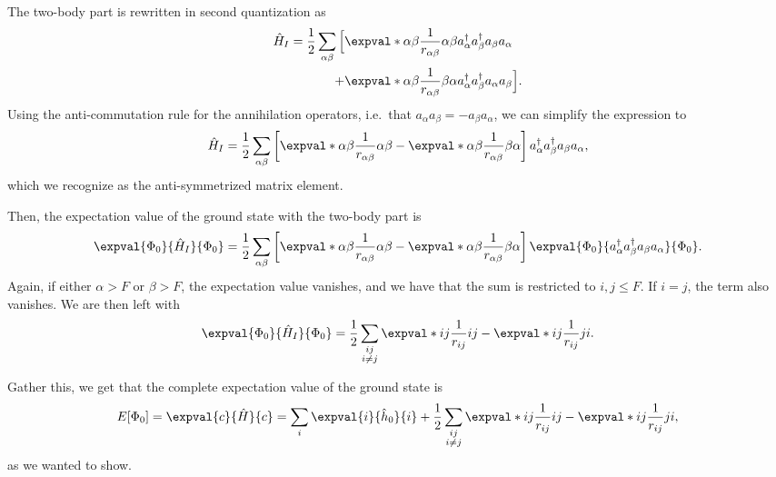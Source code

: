 The two-body part is rewritten in second quantization as
\begin{align*}
    \hat{H}_I = \frac{1}{2} \sum_{\alpha\beta} \Big[ &\expval*{\alpha\beta}{\frac{1}{r_{\alpha\beta}}}{\alpha\beta} a_\alpha^\dagger a_\beta^\dagger a_\beta a_\alpha \\
    + &\expval*{\alpha\beta}{\frac{1}{r_{\alpha\beta}}}{\beta\alpha} a_\alpha^\dagger a_\beta^\dagger a_\alpha a_\beta \Big].
\end{align*}
Using the anti-commutation rule for the annihilation operators, i.e.\ that ${a_\alpha a_\beta = -a_\beta a_\alpha}$, we can simplify the expression to
\begin{equation*}
    \hat{H}_I = \frac{1}{2} \sum_{\alpha\beta} \left[\expval*{\alpha\beta}{\frac{1}{r_{\alpha\beta}}}{\alpha\beta} - \expval*{\alpha\beta}{\frac{1}{r_{\alpha\beta}}}{\beta\alpha}\right] a_\alpha^\dagger a_\beta^\dagger a_\beta a_\alpha,
\end{equation*}
which we recognize as the anti-symmetrized matrix element.

Then, the expectation value of the ground state with the two-body part is
\begin{equation*}
    \expval{\Phi_0}{\hat{H}_I}{\Phi_0} = \frac{1}{2} \sum_{\alpha\beta} \left[\expval*{\alpha\beta}{\frac{1}{r_{\alpha\beta}}}{\alpha\beta} - \expval*{\alpha\beta}{\frac{1}{r_{\alpha\beta}}}{\beta\alpha}\right] \expval{\Phi_0}{a_\alpha^\dagger a_\beta^\dagger a_\beta a_\alpha}{\Phi_0}.
\end{equation*}
Again, if either $\alpha > F$ or $\beta > F$, the expectation value vanishes, and we have that the sum is restricted to $i,j \le F$. If $i = j$, the term also vanishes.
We are then left with
\begin{equation*}
    \expval{\Phi_0}{\hat{H}_I}{\Phi_0}
    = \frac{1}{2} \sum_{\substack{ij\\i \neq j}} \expval*{ij}{\frac{1}{r_{ij}}}{ij} - \expval*{ij}{\frac{1}{r_{ij}}}{ji}.
\end{equation*}

Gather this, we get that the complete expectation value of the ground state is
\begin{equation}
    E[\Phi_0]
    = \expval{c}{\hat{H}}{c}
    = \sum_{i} \expval{i}{\hat{h}_0}{i} + \frac{1}{2} \sum_{\substack{ij \\ i \neq j}} \expval*{ij}{\frac{1}{r_{ij}}}{ij} - \expval*{ij}{\frac{1}{r_{ij}}}{ji},
\end{equation}
as we wanted to show.

